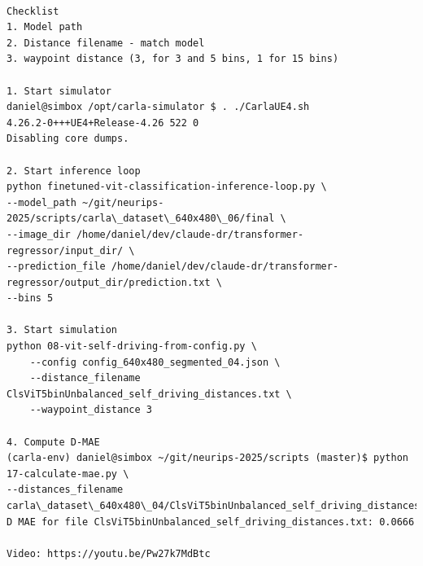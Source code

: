 \begin{verbatim}

Checklist
1. Model path
2. Distance filename - match model
3. waypoint distance (3, for 3 and 5 bins, 1 for 15 bins)

1. Start simulator
daniel@simbox /opt/carla-simulator $ . ./CarlaUE4.sh 
4.26.2-0+++UE4+Release-4.26 522 0
Disabling core dumps.

2. Start inference loop
python finetuned-vit-classification-inference-loop.py \
--model_path ~/git/neurips-2025/scripts/carla\_dataset\_640x480\_06/final \
--image_dir /home/daniel/dev/claude-dr/transformer-regressor/input_dir/ \
--prediction_file /home/daniel/dev/claude-dr/transformer-regressor/output_dir/prediction.txt \
--bins 5

3. Start simulation
python 08-vit-self-driving-from-config.py \
    --config config_640x480_segmented_04.json \
    --distance_filename ClsViT5binUnbalanced_self_driving_distances.txt \
    --waypoint_distance 3

4. Compute D-MAE
(carla-env) daniel@simbox ~/git/neurips-2025/scripts (master)$ python 17-calculate-mae.py \
--distances_filename carla\_dataset\_640x480\_04/ClsViT5binUnbalanced_self_driving_distances.txt
D MAE for file ClsViT5binUnbalanced_self_driving_distances.txt: 0.0666

Video: https://youtu.be/Pw27k7MdBtc

\end{verbatim}


